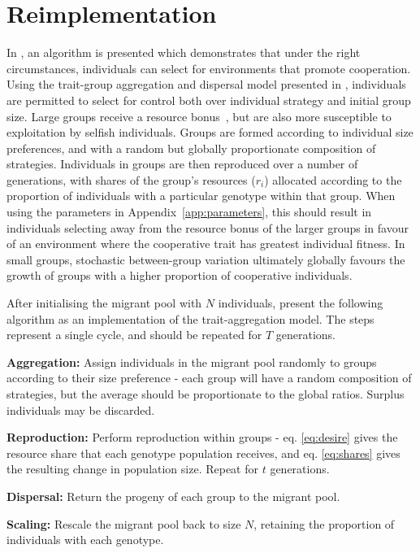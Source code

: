 \documentclass[11pt]{article}
\begin{document}
\section{Reimplementation}
In \citet{orig}, an algorithm is presented which demonstrates that under the right circumstances, individuals can select for environments that promote cooperation. Using the trait-group aggregation and dispersal model presented in \citet{wilson}, individuals are permitted to select for control both over individual strategy and initial group size. Large groups receive a resource bonus~\citep{allee}, but are also more susceptible to exploitation by selfish individuals. Groups are formed according to individual size preferences, and with a random but globally proportionate composition of strategies. Individuals in groups are then reproduced over a number of generations, with shares of the group's resources ($r_i$) allocated according to the proportion of individuals with a particular genotype within that group. When using the parameters in Appendix~\ref{app:parameters}, this should result in individuals selecting away from the resource bonus of the larger groups in favour of an environment where the cooperative trait has greatest individual fitness. In small groups, stochastic between-group variation ultimately globally favours the growth of groups with a higher proportion of cooperative individuals.

After initialising the migrant pool with $N$ individuals, \citet{orig} present the following algorithm as an implementation of the trait-aggregation model. The steps represent a single cycle, and should be repeated for $T$ generations.\\
\begin{compactenum}
\item\textbf{Aggregation:} Assign individuals in the migrant pool randomly to groups according to their size preference - each group will have a random composition of strategies, but the average should be proportionate to the global ratios. Surplus individuals may be discarded.
\item\textbf{Reproduction:} Perform reproduction within groups - eq. \ref{eq:desire} gives the resource share that each genotype population receives, and eq. \ref{eq:shares} gives the resulting change in population size. Repeat for $t$ generations.
\item\textbf{Dispersal:} Return the progeny of each group
to the migrant pool.
\item\textbf{Scaling:} Rescale the migrant pool
back to size $N$, retaining the proportion of individuals with each genotype.
\end{compactenum}
\end{document}
